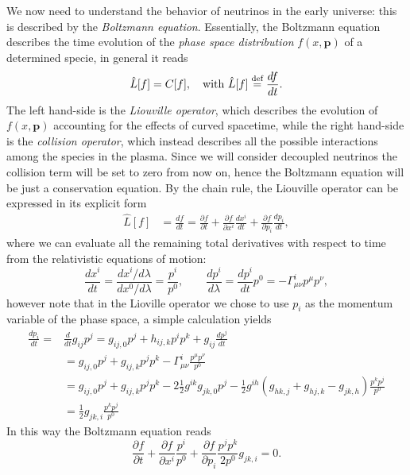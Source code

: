 We now need to understand the behavior of neutrinos in the early universe: this is described by the \emph{Boltzmann equation}. Essentially, the Boltzmann equation describes the time evolution of the \emph{phase space distribution} $f(x,\mathbf p)$ of a determined specie, in general it reads
\begin{equation}
    \hat{L}[f]=C[f],\quad \text{with } \hat{L}[f]\stackrel{\text{def}}{=}\frac{df}{dt}.
\end{equation}
The left hand-side is the \emph{Liouville operator}, which describes the evolution of $f(x,\mathbf p)$ accounting for the effects of curved spacetime, while the right hand-side is the \emph{collision operator}, which instead describes all the possible interactions among the species in the plasma. Since we will consider decoupled neutrinos the collision term will be set to zero from now on, hence the Boltzmann equation will be just a conservation equation. By the chain rule, the Liouville operator can be expressed in its explicit form
\begin{align*}
    \hat L[f]&=\frac{df}{dt}= \frac{\partial f}{\partial t}+\frac{\partial f}{\partial x^i}\frac{dx^i}{dt}+\frac{\partial f}{\partial p_i}\frac{dp_i}{dt},
\end{align*}
where we can evaluate all the remaining total derivatives with respect to time from the relativistic equations of motion:
$$\frac{dx^i}{dt}=\frac{dx^i/d\lambda}{dx^0/d\lambda}=\frac{p^i}{p^0},\qquad \frac{dp^i}{d\lambda}=\frac{dp^i}{dt}p^0=-\Gamma^i_{\mu\nu} p^\mu p^\nu,$$
however note that in the Lioville operator we chose to use $p_i$ as the momentum variable of the phase space, a simple calculation yields
\begin{align*}
        \frac{dp_i}{dt}=&\frac{d}{dt}g_{ij}p^j=g_{ij,0}p^j+h_{ij,k}p^ip^k+g_{ij}\frac{dp^j}{dt}\\
        &=g_{ij,0}p^j+g_{ij,k}p^jp^k-\Gamma^{i}_{\mu\nu}\frac{p^\mu p^\nu}{p^0}\\
        &=g_{ij,0}p^j+g_{ij,k}p^jp^k-2\frac{1}{2}g^{ik}g_{jk,0}p^j-\frac{1}{2}g^{ih}(g_{hk,j}+g_{hj,k}-g_{jk,h})\frac{p^kp^j}{p^0}\\
        &=\frac{1}{2}g_{jk,i}\frac{p^kp^j}{p^0}
\end{align*}
In this way the Boltzmann equation reads
\begin{equation}
    \frac{\partial f}{\partial t}+\frac{\partial f}{\partial x^i}\frac{p^i}{p^0}+\frac{\partial f}{\partial p_i}\frac{p^jp^k}{2p^0}g_{jk,i}=0. \label{eq:Boltzmann_neutrinos}
\end{equation}

